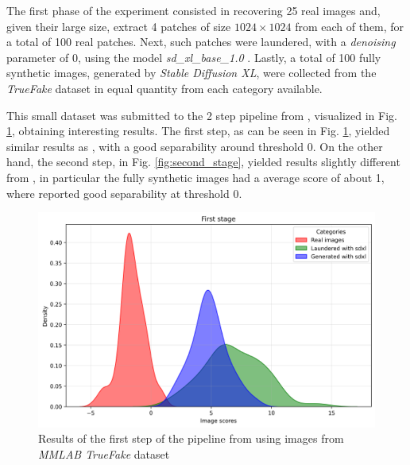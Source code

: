 \documentclass[conference]{IEEEtran} %
\begin{document}
    The first phase of the experiment consisted in recovering 25 real images and, given their large size, extract 4 patches of size $1024\times1024$ from each of them, for a total of 100 real patches. Next, such patches were laundered, with a \textit{denoising} parameter of 0, using the model \textit{sd\_xl\_base\_1.0} \cite{sdxl_base_1_0}. Lastly, a total of 100 fully synthetic images, generated by \textit{Stable Diffusion XL}, were collected from the \textit{TrueFake} dataset in equal quantity from each category available.

    This small dataset was submitted to the 2 step pipeline from \cite{mandelli2024synthetic}, visualized in Fig. \ref{fig:first_stage}, obtaining interesting results. The first step, as can be seen in Fig. \ref{fig:first_stage},  yielded similar results as \cite{mandelli2024synthetic}, with a good separability around threshold 0. On the other hand, the second step, in Fig. \ref{fig:second_stage}, yielded results slightly different from \cite{mandelli2024synthetic}, in particular the fully synthetic images had a average score of about 1, where \cite{mandelli2024synthetic} reported good separability at threshold 0. 

    \begin{figure}[h]
        \centering
        \includegraphics[width=0.95\linewidth]{Img/first_stage.png}
        \caption{Results of the first step of the pipeline from \cite{mandelli2024synthetic} using images from \textit{MMLAB TrueFake} dataset}
        \label{fig:first_stage}
    \end{figure}
\end{document}
